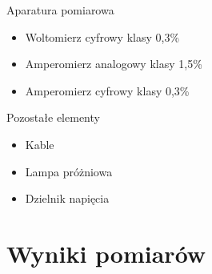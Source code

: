 \documentclass[a4paper,10pt]{article}
\begin{document}
\hspace{2in}

Aparatura pomiarowa
\begin{itemize}
  \item Woltomierz cyfrowy klasy 0,3\%
  \item Amperomierz analogowy klasy 1,5\%
  \item Amperomierz cyfrowy klasy 0,3\%
\end{itemize}

\hspace{2in}

Pozostałe elementy
\begin{itemize}
  \item Kable
  \item Lampa próżniowa
  \item Dzielnik napięcia
\end{itemize}

\section{Wyniki pomiarów}

\end{document}
